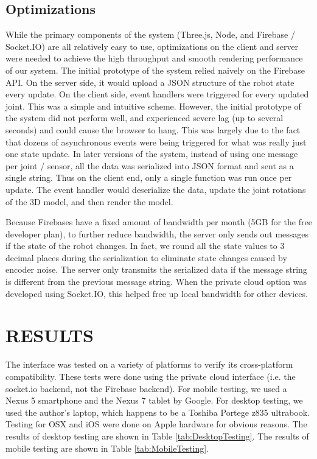 \documentclass[letterpaper, 10 pt, conference]{ieee/ieeeconf}  %
\begin{document}
\subsection{Optimizations}
While the primary components of the system (Three.js, Node, and Firebase / Socket.IO) are all relatively easy to use, optimizations on the client and server were needed to achieve the high throughput and smooth rendering performance of our system.
The initial prototype of the system relied naively on the Firebase API.
On the server side, it would upload a JSON structure of the robot state every update.
On the client side, event handlers were triggered for every updated joint.
This was a simple and intuitive scheme.
However, the initial prototype of the system did not perform well, and experienced severe lag (up to several seconds) and could cause the browser to hang.
This was largely due to the fact that dozens of asynchronous events were being triggered for what was really just one state update.
In later versions of the system, instead of using one message per joint / sensor, all the data was serialized into JSON format and sent as a single string.
Thus on the client end, only a single function was run once per update.
The event handler would deserialize the data, update the joint rotations of the 3D model, and then render the model.

Because Firebases have a fixed amount of bandwidth per month (5GB for the free developer plan), to further reduce bandwidth, the server only sends out messages if the state of the robot changes.
In fact, we round all the state values to 3 decimal places during the serialization to eliminate state changes caused by encoder noise.
The server only transmits the serialized data if the message string is different from the previous message string.
When the private cloud option was developed using Socket.IO, this helped free up local bandwidth for other devices.

\section{RESULTS}
The interface was tested on a variety of platforms to verify its cross-platform compatibility.
These tests were done using the private cloud interface (i.e. the socket.io backend, not the Firebase backend).
For mobile testing, we used a Nexus 5 smartphone and the Nexus 7 tablet by Google.
For desktop testing, we used the author's laptop, which happens to be a Toshiba Portege z835 ultrabook.
Testing for OSX and iOS were done on Apple hardware for obvious reasons.
The results of desktop testing are shown in Table \ref{tab:DesktopTesting}.
The results of mobile testing are shown in Table \ref{tab:MobileTesting}.
\end{document}
